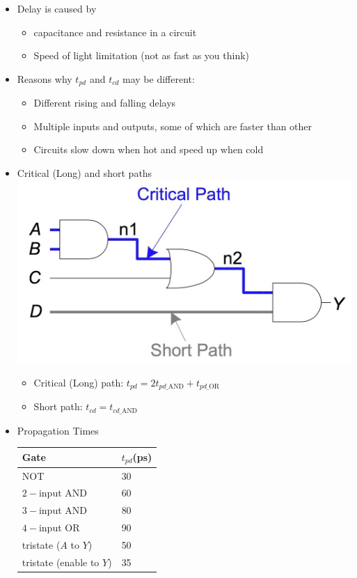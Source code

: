 \documentclass[a4paper]{article}
\begin{document}
\begin{itemize}
\begin{itemize}
\item Delay is caused by 
\begin{itemize}
\item capacitance and resistance in a circuit
\item Speed of light limitation (not as fast as you think)
\end{itemize}
\item Reasons why $t_{pd}$ and $t_{cd}$ may be different:
\begin{itemize}
\item Different rising and falling delays
\item Multiple inputs and outputs, some of which are faster than other
\item Circuits slow down when hot and speed up when cold
\end{itemize}
\item Critical (Long) and short paths\\
\includegraphics[scale=0.25]{Figures/CriticalAndShortPath.jpg}
\begin{itemize}
\item Critical (Long) path: $t_{pd}=2t_{pd\_\text{AND}}+t_{pd\_\text{OR}}$
\item Short path: $t_{cd}=t_{cd\_\text{AND}}$
\end{itemize}
\item Propagation Times\\
\begin{tabular}{l|l}
Gate & $t_{pd}$(ps)\\\hline
NOT & 30\\
$2-$input AND & 60\\
$3-$input AND & 80\\
$4-$input OR & 90\\
tristate ($A$ to $Y$) & 50\\
tristate (enable to $Y$) & 35

\end{tabular}
\end{itemize}
\end{itemize}
\end{document}
